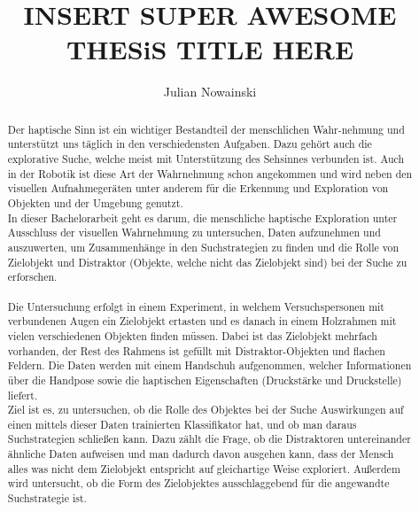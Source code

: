 \documentclass[]{article}
\title{INSERT SUPER AWESOME THESiS TITLE HERE}
\author{Julian Nowainski}
\date{}
\begin{document}
\maketitle

\begin{abstract}
\noindent
Der haptische Sinn ist ein wichtiger Bestandteil der menschlichen Wahr-nehmung und unterstützt uns täglich in den verschiedensten Aufgaben. Dazu gehört auch die explorative Suche, welche meist mit Unterstützung des Sehsinnes verbunden ist. Auch in der Robotik ist diese Art der Wahrnehmung schon angekommen und wird neben den visuellen Aufnahmegeräten unter anderem für die Erkennung und Exploration von Objekten und der Umgebung genutzt. \\
In dieser Bachelorarbeit geht es darum, die menschliche haptische Exploration unter Ausschluss der visuellen Wahrnehmung zu untersuchen, Daten aufzunehmen und auszuwerten, um Zusammenhänge in den Suchstrategien zu finden und die Rolle von Zielobjekt und Distraktor (Objekte, welche nicht das Zielobjekt sind) bei der Suche zu erforschen. \\
\\
Die Untersuchung erfolgt in einem Experiment, in welchem Versuchspersonen mit verbundenen Augen ein Zielobjekt ertasten und es danach in einem Holzrahmen mit vielen verschiedenen Objekten finden müssen. Dabei ist das Zielobjekt mehrfach vorhanden, der Rest des Rahmens ist gefüllt mit Distraktor-Objekten und flachen Feldern. Die Daten werden mit einem Handschuh aufgenommen, welcher Informationen über die Handpose sowie die haptischen Eigenschaften (Druckstärke und Druckstelle) liefert.\\
Ziel ist es, zu untersuchen, ob die Rolle des Objektes bei der Suche Auswirkungen auf einen mittels dieser Daten trainierten Klassifikator hat, und ob man daraus Suchstrategien schließen kann. Dazu zählt die Frage, ob die Distraktoren untereinander ähnliche Daten aufweisen und man dadurch davon ausgehen kann, dass der Mensch alles was nicht dem Zielobjekt entspricht auf gleichartige Weise exploriert. Außerdem wird untersucht, ob die Form des Zielobjektes ausschlaggebend für die angewandte Suchstrategie ist.  

\end{abstract}
\end{document}
